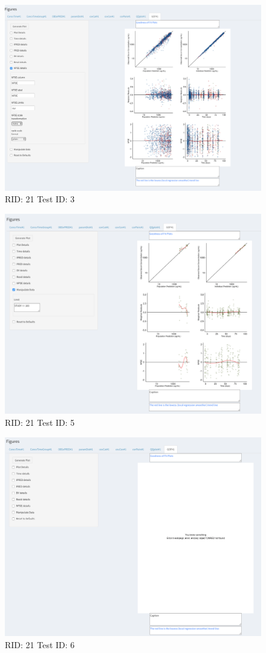 \begin{figure}[H]
\includegraphics[width=.8\textwidth]{screencaps/21-3-5.png}
\caption{RID: 21 Test ID: 3}
\end{figure}
\begin{figure}[H]
\includegraphics[width=.8\textwidth]{screencaps/21-5-1.png}
\caption{RID: 21 Test ID: 5}
\end{figure}
\begin{figure}[H]
\includegraphics[width=.8\textwidth]{screencaps/21-6-1.png}
\caption{RID: 21 Test ID: 6}
\end{figure}
